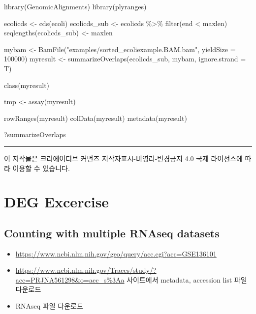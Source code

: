 \documentclass[
]{book}
\newenvironment{Shaded}{\begin{snugshade}}{\end{snugshade}}
\newcommand{\AttributeTok}[1]{\textcolor[rgb]{0.77,0.63,0.00}{#1}}
\newcommand{\DecValTok}[1]{\textcolor[rgb]{0.00,0.00,0.81}{#1}}
\newcommand{\FunctionTok}[1]{\textcolor[rgb]{0.00,0.00,0.00}{#1}}
\newcommand{\NormalTok}[1]{#1}
\newcommand{\OtherTok}[1]{\textcolor[rgb]{0.56,0.35,0.01}{#1}}
\newcommand{\SpecialCharTok}[1]{\textcolor[rgb]{0.00,0.00,0.00}{#1}}
\newcommand{\StringTok}[1]{\textcolor[rgb]{0.31,0.60,0.02}{#1}}
\providecommand{\tightlist}{%
  \setlength{\itemsep}{0pt}\setlength{\parskip}{0pt}}
\begin{document}
\begin{Shaded}
\begin{Highlighting}[]
\FunctionTok{library}\NormalTok{(GenomicAlignments)}
\FunctionTok{library}\NormalTok{(plyranges)}

\NormalTok{ecolicds }\OtherTok{\textless{}{-}} \FunctionTok{cds}\NormalTok{(ecoli)}
\NormalTok{ecolicds\_sub }\OtherTok{\textless{}{-}}\NormalTok{ ecolicds }\SpecialCharTok{\%\textgreater{}\%} 
  \FunctionTok{filter}\NormalTok{(end }\SpecialCharTok{\textless{}}\NormalTok{ maxlen)}
\FunctionTok{seqlengths}\NormalTok{(ecolicds\_sub) }\OtherTok{\textless{}{-}}\NormalTok{ maxlen}


\NormalTok{mybam }\OtherTok{\textless{}{-}} \FunctionTok{BamFile}\NormalTok{(}\StringTok{"examples/sorted\_ecoliexample.BAM.bam"}\NormalTok{, }\AttributeTok{yieldSize =} \DecValTok{100000}\NormalTok{)}
\NormalTok{myresult }\OtherTok{\textless{}{-}} \FunctionTok{summarizeOverlaps}\NormalTok{(ecolicds\_sub, mybam, }\AttributeTok{ignore.strand =}\NormalTok{ T)}

\FunctionTok{class}\NormalTok{(myresult)}

\NormalTok{tmp }\OtherTok{\textless{}{-}} \FunctionTok{assay}\NormalTok{(myresult)}

\FunctionTok{rowRanges}\NormalTok{(myresult)}
\FunctionTok{colData}\NormalTok{(myresult)}
\FunctionTok{metadata}\NormalTok{(myresult)}

\NormalTok{?summarizeOverlaps}
\end{Highlighting}
\end{Shaded}

\begin{center}\rule{0.5\linewidth}{0.5pt}\end{center}

이 저작물은 크리에이티브 커먼즈 저작자표시-비영리-변경금지 4.0 국제 라이선스에 따라 이용할 수 있습니다.

\hypertarget{deg-excercise}{%
\chapter{DEG Excercise}\label{deg-excercise}}

\hypertarget{counting-with-multiple-rnaseq-datasets}{%
\section{Counting with multiple RNAseq datasets}\label{counting-with-multiple-rnaseq-datasets}}

\begin{itemize}
\tightlist
\item
  \url{https://www.ncbi.nlm.nih.gov/geo/query/acc.cgi?acc=GSE136101}
\item
  \url{https://www.ncbi.nlm.nih.gov/Traces/study/?acc=PRJNA561298\&o=acc_s\%3Aa} 사이트에서 metadata, accession list 파일 다운로드
\item
  RNAseq 파일 다운로드
\end{itemize}
\end{document}
